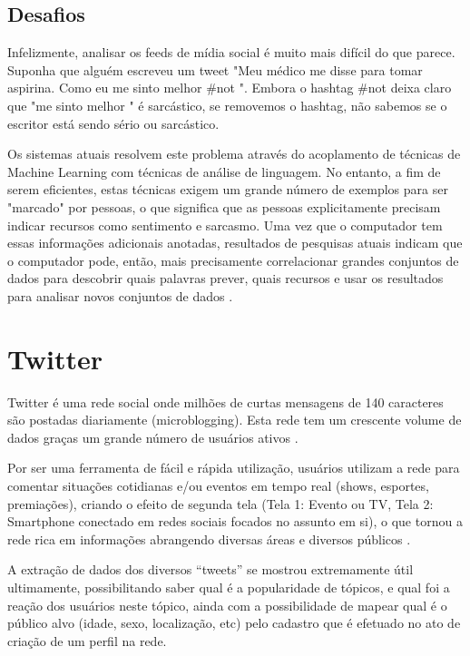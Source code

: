 \documentclass[
	12pt,				%
	openright,			%
	oneside,			%
	a4paper,			%
	english,			%
	spanish,			%
	brazil				%
	]{abntex2}
\begin{document}
	\subsection*{Desafios}
Infelizmente, analisar os feeds de mídia social é muito mais difícil do que parece. Suponha que alguém escreveu um tweet "Meu médico me disse para tomar aspirina. Como eu me sinto melhor \#not ". Embora o hashtag \#not deixa claro que "me sinto melhor " é sarcástico, se removemos o hashtag, não sabemos se o escritor está sendo sério ou sarcástico.

Os sistemas atuais resolvem este problema através do acoplamento de técnicas de Machine Learning com técnicas de análise de linguagem. No entanto, a fim de serem eficientes, estas técnicas exigem um grande número de exemplos para ser "marcado" por pessoas, o que significa que as pessoas explicitamente precisam indicar recursos como sentimento e sarcasmo. Uma vez que o computador tem essas informações adicionais anotadas, resultados de pesquisas atuais indicam que o computador pode, então, mais precisamente correlacionar grandes conjuntos de dados para descobrir quais palavras prever, quais recursos e usar os resultados para analisar novos conjuntos de dados \cite{book_social_machines}.

	\section{Twitter}
	
	Twitter é uma rede social onde milhões de curtas mensagens de 140 caracteres são postadas diariamente (microblogging). Esta rede tem um crescente volume de dados graças um grande número de usuários ativos \cite{conference_twitter_alg}.

	Por ser uma ferramenta de fácil e rápida utilização, usuários utilizam a rede para comentar situações cotidianas e/ou eventos em tempo real (shows, esportes, premiações), criando o efeito de segunda tela (Tela 1: Evento ou TV, Tela 2: Smartphone conectado em redes sociais focados no assunto em si), o que tornou a rede rica em informações abrangendo diversas áreas e diversos públicos \cite{conference_twitter_sports}.

	A extração de dados dos diversos “tweets” se mostrou extremamente útil ultimamente, possibilitando saber qual é a popularidade de tópicos, e qual foi a reação dos usuários neste tópico,  ainda com a possibilidade de mapear qual é o público alvo (idade, sexo, localização, etc) pelo cadastro que é efetuado no ato de criação de um perfil na rede.
\end{document}
